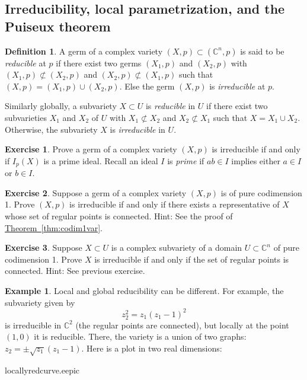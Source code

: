 \documentclass[12pt,openany]{book}
\newcommand{\C}{{\mathbb{C}}}
\newcommand{\myindex}[1]{#1\index{#1}}
\theoremstyle{plain}
\theoremstyle{remark}
\theoremstyle{definition}
\newtheorem{defn}[thm]{Definition}
\newenvironment{exbox}{%
    \def\FrameCommand{\vrule width 1pt \relax\hspace {10pt}}%
    \MakeFramed {\advance \hsize -\width \FrameRestore }%
}{%
    \endMakeFramed
}
\newenvironment{myfig}{%
    \begin{center}
}{%
    \end{center}
}
\theoremstyle{exercise}
\newtheorem{exercise}{Exercise}[section]
\theoremstyle{example}
\newtheorem{example}[thm]{Example}
\newcommand{\thmref}[1]{\hyperref[#1]{Theorem~\ref*{#1}}}
\begin{document}
\subsection{Irreducibility, local parametrization, and the Puiseux
theorem}

\begin{defn}
A germ of a complex variety $(X,p) \subset (\C^n,p)$ is said to be
\emph{\myindex{reducible}} at $p$ if there exist
two germs $(X_1,p)$ and $(X_2,p)$ with
$(X_1,p) \not\subset (X_2,p)$ and
$(X_2,p) \not\subset (X_1,p)$ such that
$(X,p) = (X_1,p) \cup (X_2,p)$.
Else the germ $(X,p)$ is \emph{\myindex{irreducible}} at $p$.

Similarly globally, a subvariety $X \subset U$ is
\emph{reducible} in $U$ if there exist
two subvarieties
$X_1$ and $X_2$ of $U$ with
$X_1 \not\subset X_2$ and
$X_2 \not\subset X_1$ such that
$X = X_1 \cup X_2$.
Otherwise, the subvariety $X$ is \emph{irreducible} in $U$.
\end{defn}

\begin{exbox}
\begin{exercise}
Prove a germ of a complex variety $(X,p)$ is irreducible
if and only if $I_p(X)$ is a prime ideal.
Recall an ideal $I$ is \emph{prime}
if $ab \in I$ implies either $a \in I$ or $b
\in I$.
\end{exercise}

\begin{exercise}
Suppose a germ of a complex variety $(X,p)$ is of pure codimension 1.
Prove $(X,p)$ is irreducible if and only if there
exists a representative of $X$ whose set of regular points
is connected.  Hint: See the proof of \thmref{thm:codim1var}.
\end{exercise}

\begin{exercise}
Suppose $X \subset U$ is a complex subvariety of a domain $U \subset \C^n$
of pure codimension 1.
Prove $X$ is irreducible if and only if the set of regular points
is connected.  Hint: See previous exercise.
\end{exercise}
\end{exbox}

\begin{example}
Local and global reducibility can be different.  For example,
the subvariety given by
\begin{equation*}
z_2^2 = z_1{(z_1-1)}^2
\end{equation*}
is irreducible in $\C^2$ (the regular points are connected), but locally
at the point
$(1,0)$ it is reducible.  There, the variety is
a union of two graphs: $z_2 = \pm \sqrt{z_1}(z_1-1)$.
Here is a plot in two real dimensions:

\begin{myfig}
\medskip
{locallyredcurve.eepic}
\bigskip
\end{myfig}
\end{example}
\end{document}
